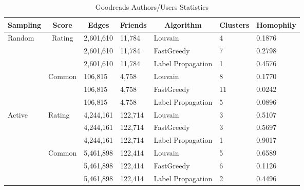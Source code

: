\documentclass[11pt]{article}
\begin{document}
\begin{table}[h]
\begin{tabular}{|l|l|l|l|l|l|l|}
\hline
\multicolumn{1}{|c|}{\textbf{Sampling}} & \multicolumn{1}{c|}{\textbf{Score}} & \multicolumn{1}{c|}{\textbf{Edges}} & \multicolumn{1}{c|}{\textbf{Friends}} & \multicolumn{1}{c|}{\textbf{Algorithm}} & \multicolumn{1}{c|}{\textbf{Clusters}} & \multicolumn{1}{c|}{\textbf{Homophily}} \\ \hline
\multirow{6}{*}{Random} & \multicolumn{1}{c|}{\multirow{3}{*}{Rating}} & 2,601,610 & 11,784 & Louvain & 4 & 0.1876 \\ \cline{3-7} 
 & \multicolumn{1}{c|}{} & 2,601,610 & 11,784 & FastGreedy & 7 & 0.2798 \\ \cline{3-7} 
 & \multicolumn{1}{c|}{} & 2,601,610 & 11,784 & Label Propagation & 1 & 0.4576 \\ \cline{2-7} 
 & \multirow{3}{*}{Common} & 106,815 & 4,758 & Louvain & 8 & 0.1770 \\ \cline{3-7} 
 &  & 106,815 & 4,758 & FastGreedy & 11 & 0.0242 \\ \cline{3-7} 
 &  & 106,815 & 4,758 & Label Propagation & 5 & 0.0896 \\ \hline
\multirow{6}{*}{Active} & \multirow{3}{*}{Rating} & 4,244,161 & 122,714 & Louvain & 3 & 0.5107 \\ \cline{3-7} 
 &  & 4,244,161 & 122,714 & FastGreedy & 3 & 0.5697 \\ \cline{3-7} 
 &  & 4,244,161 & 122,714 & Label Propagation & 1 & 0.9017 \\ \cline{2-7} 
 & \multirow{3}{*}{Common} & 5,461,898 & 122,414 & Louvain & 5 & 0.6589 \\ \cline{3-7} 
 &  & 5,461,898 & 122,414 & FastGreedy & 6 & 0.1126 \\ \cline{3-7} 
 &  & 5,461,898 & 122,414 & Label Propagation & 2 & 0.4496 \\ \hline
\end{tabular}
\caption{Goodreads Authors/Users Statistics}
\label{table:analysis_stat}
\end{table}

\end{document}

